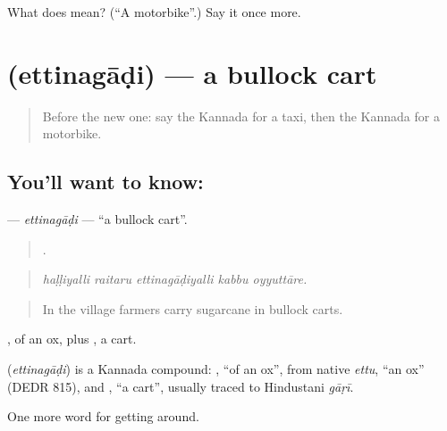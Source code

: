 \begin{tcolorbox}[breakable,colback=teal!4,colframe=teal!35!black,title={Before you move on}]
What does  mean? (\textquotedblleft{}A motorbike\textquotedblright{}.) Say it once more.
\end{tcolorbox}
\section[\texorpdfstring{\kn{ಎತ್ತಿನಗಾಡಿ} (ettinagāḍi)}{ಎತ್ತಿನಗಾಡಿ (ettinagāḍi)}]{ (ettinagāḍi) — a bullock cart}

\label{lesson:KA-C451-ettinagadi}



\begin{quote}
Before the new one: say the Kannada for a taxi, then the Kannada for a motorbike.
\end{quote}

\subsection*{You'll want to know: }
\textbf{} — \emph{ettinagāḍi} — \textquotedblleft{}a bullock cart\textquotedblright{}.

\begin{quote}
    .
\end{quote}

\begin{quote}
\emph{haḷḷiyalli raitaru ettinagāḍiyalli kabbu oyyuttāre.}
\end{quote}

\begin{quote}
In the village farmers carry sugarcane in bullock carts.
\end{quote}

, of an ox, plus , a cart.

\begin{cousinweb}
\textbf{} (\emph{ettinagāḍi}) is a Kannada compound: , \textquotedblleft{}of an ox\textquotedblright{}, from native \emph{ettu}, \textquotedblleft{}an ox\textquotedblright{} (DEDR 815), and , \textquotedblleft{}a cart\textquotedblright{}, usually traced to Hindustani \emph{gāṛī}.
\end{cousinweb}

\begin{grammarlens}[title={What you've built}]
One more word for getting around.
\end{grammarlens}

